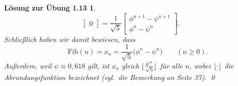 \documentclass[a4paper,11pt,reqno]{amsart}
\DeclarePairedDelimiter{\floor}{\lfloor}{\rfloor}
\theoremstyle{uremark}
\newtheorem*{loes}{L\"osung zur \"Ubung 1.13}
\begin{document}
\begin{loes}
\begin{equation*}
\begin{bmatrix}
            0  
        \end{bmatrix} = \frac{1}{\sqrt{5}}\begin{bmatrix}
            \phi^{n + 1} - \psi^{n + 1} \\
            \phi^n - \psi^n
        \end{bmatrix}.
    \end{equation*}
    Schlie\ss lich haben wir damit bewiesen, dass
    \begin{equation*}%
        \qquad \boxed{\text{Fib}(n) = x_n = \frac{1}{\sqrt{5}}\big( \phi^n -
        \psi^n \big)}\qquad (n \ge 0).
    \end{equation*}
    Au\ss erdem, weil $ \psi \approx 0,618 $ gilt, ist $ x_n $
    gleich $ \floor{\frac{\phi^n}{\sqrt{5}}} $ f\"ur alle $ n $, wobei $
    \floor{\cdot} $ die Abrundungsfunktion bezeichnet (vgl.~die Bemerkung an
    Seite 37). \qed
\end{loes}
\end{document}
